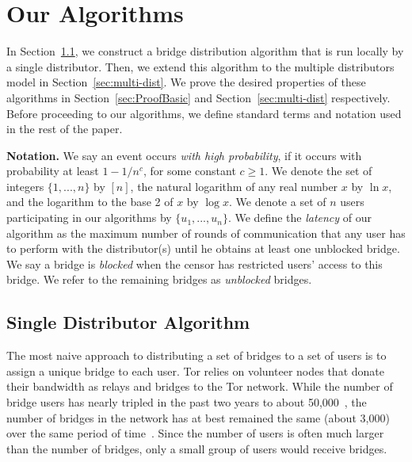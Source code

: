 \documentclass[letterpaper,twocolumn,10pt]{article}
\newcommand{\fullpaper}[1]{#1}
\newcommand{\fullpaper}[1]{}
\newcommand{\sfsize}{\fontsize{0.68\baselineskip}{0.68\baselineskip}\selectfont}
\newcommand{\sans}[1]{\textbf{\textsf{\sfsize \mbox{#1}}}}
\newcommand{\para}[1]{\vspace{0.55em} \noindent \sans{{\mbox{#1}}}}
\begin{document}
\section{Our Algorithms} \label{sec:algorithm} 
In Section~\ref{sec:basic-alg}, we construct a bridge distribution algorithm that is run locally by a single distributor. Then, we extend this algorithm to the multiple distributors model in Section~\ref{sec:multi-dist}.
We prove the desired properties of these algorithms in Section~\ref{sec:ProofBasic} and Section~\ref{sec:multi-dist} respectively. 
Before proceeding to our algorithms, we define standard terms and notation used in the rest of the paper. 

\para{Notation.} We say an event occurs \emph{with high probability}, if it occurs with probability at least \emph{${1-1/n^c}$}, for some constant ${c \geq 1}$. We denote the set of integers ${\{1,...,n\}}$ by $[n]$, the natural logarithm of any real number $x$ by $\ln{x}$, and the logarithm to the base 2 of $x$ by $\log{x}$. We denote a set of $n$ users participating in our algorithms by ${\{u_1,...,u_n\}}$. We define the \emph{latency} of our algorithm as the maximum number of rounds of communication that any user has to perform with the distributor(s) until he obtains at least one unblocked bridge. \fullpaper{We say a bridge is \emph{blocked} when the censor has restricted users' access to this bridge. We refer to the remaining bridges as \emph{unblocked} bridges.}

\subsection{Single Distributor Algorithm} \label{sec:basic-alg}
The most naive approach to distributing a set of bridges to a set of users is to assign a unique bridge to each user. Tor relies on volunteer nodes that donate their bandwidth as relays and bridges to the Tor network. While the number of bridge users has nearly tripled in the past two years to about 50,000~\cite{Tor:BridgeUsers}, the number of bridges in the network has at best remained the same (about 3,000) over the same period of time~\cite{Tor:Bridges}. Since the number of users is often much larger than the number of bridges, only a small group of users would receive bridges.
\end{document}
